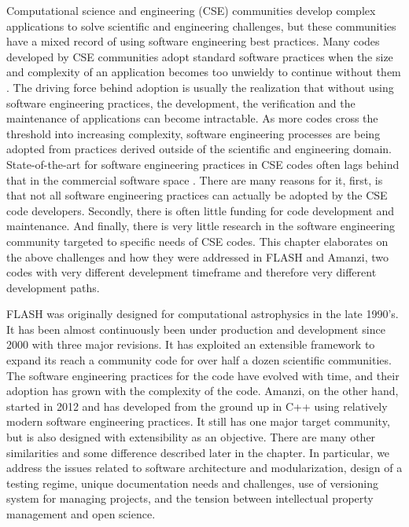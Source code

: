 \label{sec:introduction}
Computational science and engineering (CSE) communities develop
complex applications to solve scientific and engineering challenges,
but these communities have a mixed record of using software
engineering best practices. Many codes developed by CSE communities
adopt standard software practices when the size and complexity of an
application becomes too unwieldy to continue without them
\cite{cc2012}. The driving force behind adoption is usually the
realization that without using software engineering practices, the
development, the verification and the maintenance of applications can become
intractable. As more codes cross the threshold into increasing
complexity, software engineering processes are being adopted from
practices derived outside of the scientific and engineering domain.
State-of-the-art for software engineering practices in CSE codes often lags
behind that in the commercial software space
\cite{segal2008developing,basili2008understanding, hochstein2008asc}. 
There are many reasons for it, first, is
that not all software engineering practices can actually be adopted by
the CSE code developers.  Secondly, there is often little funding for
code development and maintenance. And finally, there is very little
research in the software engineering community targeted to specific
needs of CSE codes. This chapter elaborates on the above challenges and
how they were addressed in FLASH and Amanzi, two codes with very
different develepment timeframe and therefore very different
development paths. 

FLASH was originally designed for computational
astrophysics in the late 1990's. It has been almost continuously been
under production and development since 2000 with three major
revisions. It has exploited an extensible framework to expand its
reach a community code for over half a dozen scientific
communities. The software engineering practices for the code have
evolved with time, and their adoption has grown with the complexity of
the code. Amanzi, on the other hand, started in 2012 and has developed
from the ground up in C++ using relatively modern software engineering
practices. It still has one major target community, but is also
designed with extensibility as an objective. There are many other
similarities and some difference described later in the chapter.
In particular, we address the issues related to software
architecture and modularization, design of a testing regime,
unique documentation needs and challenges, use of versioning system 
for managing projects, and the tension between intellectual property
management and open science.

